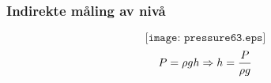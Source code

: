\documentclass[aspectratio=169,xcolor=dvipsnames]{beamer}
\begin{document}
%
%
%
%
%
\begin{frame}
	\frametitle{Indirekte måling av nivå}

	$$\texttt{[image: pressure63.eps]}$$
$$P = \rho g h \Rightarrow h = {P \over {\rho g}}$$
\end{frame}
%
%
%
%
%
%
%
%
%
\end{document}
